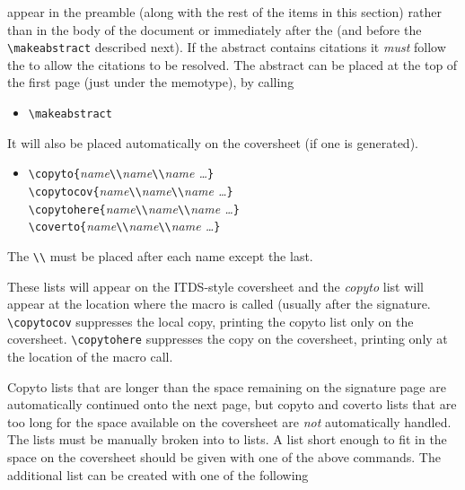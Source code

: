 appear in the preamble (along with the rest of the items in this
section) rather than in the body of the document or immediately after
the \verb|| (and before the \verb|\makeabstract|
described next).  If the abstract contains citations it {\it must}
follow the \verb|| to allow the citations to be
resolved.  The abstract 
can be placed at the top of the first page (just under
the memotype), by calling 
\begin{itemize}
\item[]
\verb|\makeabstract|
\end{itemize}
It will also be placed automatically on the coversheet (if one is
generated).
\begin{itemize}
\item[]
\verb|\copyto{|{\it name\/}\verb|\\|{\it name\/}\verb|\\|{\it name \dots}\verb|}|\\
\verb|\copytocov{|{\it name\/}\verb|\\|{\it name\/}\verb|\\|{\it name \dots}\verb|}|\\
\verb|\copytohere{|{\it name\/}\verb|\\|{\it name\/}\verb|\\|{\it name \dots}\verb|}|\\
\verb|\coverto{|{\it name\/}\verb|\\|{\it name\/}\verb|\\|{\it name \dots}\verb|}|
\end{itemize}
The \verb|\\| 
must be placed after each name except the last.

These lists will appear on the ITDS-style coversheet and the {\it copyto} list
will appear at the location where the macro is called (usually after
the signature.  \verb|\copytocov| suppresses the local copy, printing
the copyto list only on the coversheet.  \verb|\copytohere| suppresses
the copy on the coversheet, printing only at the location of the macro
call.  

Copyto lists that are longer than the space remaining on the signature
page are automatically continued onto the next page, but copyto and
coverto lists that are too long for the space available on the
coversheet are {\it not} automatically handled.  The lists must be
manually broken into to lists.  A list short enough to fit in the
space on the coversheet should be given with one of the above
commands.  The additional list can be created with one of the following

